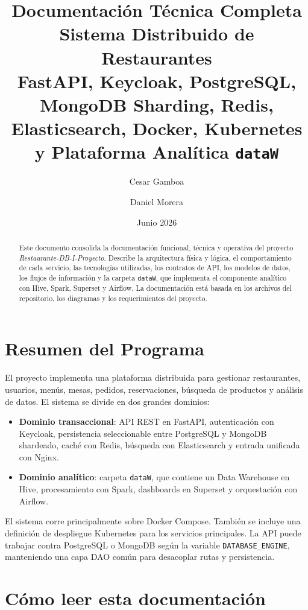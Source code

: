 \documentclass[12pt,letterpaper]{article}
\title{
    \textbf{Documentación Técnica Completa}\\
    Sistema Distribuido de Restaurantes\\
    \large FastAPI, Keycloak, PostgreSQL, MongoDB Sharding, Redis, Elasticsearch, Docker, Kubernetes y Plataforma Analítica \texttt{dataW}
}
\author{Cesar Gamboa \and Daniel Morera}
\date{Junio 2026}
\def\codefile#1{\nolinkurl{#1}}
\begin{document}
\maketitle
\thispagestyle{empty}

\begin{abstract}
Este documento consolida la documentación funcional, técnica y operativa del proyecto \textit{Restaurante-DB-I-Proyecto}. Describe la arquitectura física y lógica, el comportamiento de cada servicio, las tecnologías utilizadas, los contratos de API, los modelos de datos, los flujos de información y la carpeta \codefile{dataW}, que implementa el componente analítico con Hive, Spark, Superset y Airflow. La documentación está basada en los archivos del repositorio, los diagramas y los requerimientos del proyecto.
\end{abstract}

\newpage
\tableofcontents
\newpage

\section{Resumen del Programa}

El proyecto implementa una plataforma distribuida para gestionar restaurantes, usuarios, menús, mesas, pedidos, reservaciones, búsqueda de productos y análisis de datos. El sistema se divide en dos grandes dominios:

\begin{itemize}
    \item \textbf{Dominio transaccional}: API REST en FastAPI, autenticación con Keycloak, persistencia seleccionable entre PostgreSQL y MongoDB shardeado, caché con Redis, búsqueda con Elasticsearch y entrada unificada con Nginx.
    \item \textbf{Dominio analítico}: carpeta \codefile{dataW}, que contiene un Data Warehouse en Hive, procesamiento con Spark, dashboards en Superset y orquestación con Airflow.
\end{itemize}

El sistema corre principalmente sobre Docker Compose. También se incluye una definición de despliegue Kubernetes para los servicios principales. La API puede trabajar contra PostgreSQL o MongoDB según la variable \codefile{DATABASE\_ENGINE}, manteniendo una capa DAO común para desacoplar rutas y persistencia.

\section{Cómo leer esta documentación}
\end{document}
